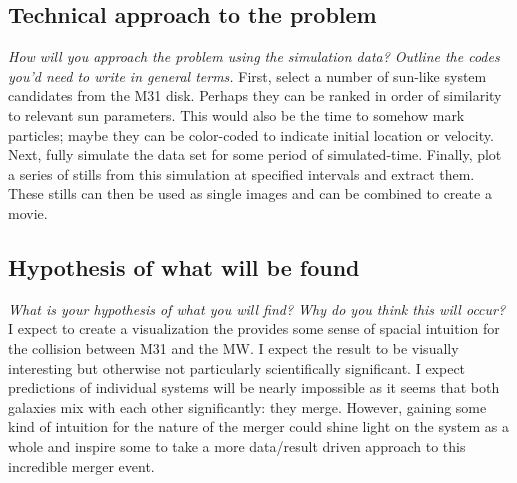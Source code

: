 \documentclass[twocolumn]{aastex63}
\begin{document}
\subsection{Technical approach to the problem}
\emph{How will you approach the problem using the simulation data? Outline the codes you'd need to write in general terms.} First, select a number of sun-like system candidates from the M31 disk. Perhaps they can be ranked in order of similarity to relevant sun parameters. This would also be the time to somehow mark particles; maybe they can be color-coded to indicate initial location or velocity. Next, fully simulate the data set for some period of simulated-time. Finally, plot a series of stills from this simulation at specified intervals and extract them. These stills can then be used as single images and can be combined to create a movie.

\subsection{Hypothesis of what will be found}
\emph{What is your hypothesis of what you will find? Why do you think this will occur?} I expect to create a visualization the provides some sense of spacial intuition for the collision between M31 and the MW. I expect the result to be visually interesting but otherwise not particularly scientifically significant. I expect predictions of individual systems will be nearly impossible as it seems that both galaxies mix with each other significantly: they merge. However, gaining some kind of intuition for the nature of the merger could shine light on the system as a whole and inspire some to take a more data/result driven approach to this incredible merger event.



{}

\end{document}
